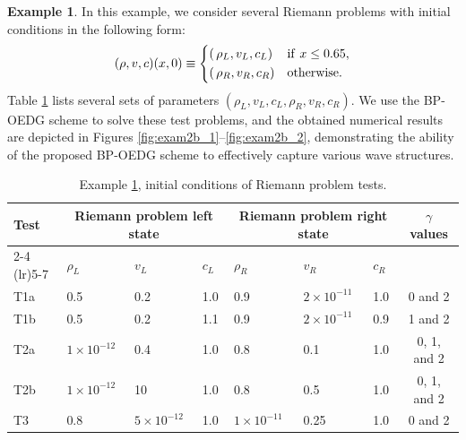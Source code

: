 \documentclass[times,final]{elsarticle}
\numberwithin{equation}{section}
\theoremstyle{definition}
\newtheorem{exa}[remark]{Example}
\theoremstyle{remark}
\begin{document}
\begin{exa} \label{exam2b}
	In this example, we consider several Riemann problems with initial conditions in the following form:
	\begin{equation*}\label{eq:1802}
		(\rho,v,c)(x,0)
		\equiv
		\begin{dcases}
			(\,\rho_L,v_L,c_L)
			&
			{\rm if }~ x \le 0.65,
			\\
			(\,\rho_R,v_R,c_R)
			&
			{\rm otherwise}.
		\end{dcases}
	\end{equation*}
	Table \ref{tab:exam2b} lists several sets of parameters $(\rho_L,v_L,c_L,\rho_R,v_R,c_R)$.
	We use the BP-OEDG scheme to solve these test problems, and the obtained numerical results are depicted in Figures \ref{fig:exam2b_1}--\ref{fig:exam2b_2}, demonstrating the ability of the proposed BP-OEDG scheme to effectively capture various wave structures.
	
	\begin{table}[h!]
		\renewcommand\arraystretch{1.2}
		\centering
		\caption{\sf Example \ref{exam2b}, initial conditions of Riemann problem tests.}
		\begin{tabular}{l lll lll c}
			
			\toprule[1.5pt]
			
			\multirow{2}{*}{ Test } & \multicolumn{3}{c}{Riemann problem left state} & \multicolumn{3}{c}{Riemann problem right state} & \multirow{2}{*}{ $\gamma$ values } \\
			
			\cmidrule(lr){2-4} \cmidrule(lr){5-7}
			
			& $\rho_L$ & $v_L$ & $c_L$ & $\rho_R$ & $v_R$ & $c_R$ & \\
			
			\midrule[1.5pt]
			
			{T1a} & 0.5 & 0.2 & 1.0 & 0.9 & $2\times 10^{-11}$ & 1.0 & 0 and 2 \\
			{T1b} & 0.5 & 0.2 & 1.1 & 0.9 & $2\times 10^{-11}$ & 0.9 & 1 and 2 \\
			{T2a} & $1\times10^{-12}$ & 0.4 & 1.0  & 0.8 & 0.1 & 1.0 & 0, 1, and 2 \\ 
			{T2b} & $1\times10^{-12}$ & 10 & 1.0  & 0.8 & 0.5 & 1.0 & 0, 1, and 2 \\ 
			{T3 } & 0.8 & $5\times 10^{-12}$ & 1.0  & $1\times10^{-11}$ & 0.25 & 1.0 & 0 and 2 \\ 
			
			\bottomrule[1.5pt]
			
		\end{tabular}
		\label{tab:exam2b}
	\end{table}
	

\end{exa}
\end{document}
